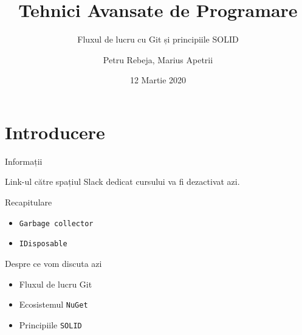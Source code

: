\documentclass[presentation]{beamer}
\author{Petru Rebeja, Marius Apetrii}
\date{12 Martie 2020}
\title{Tehnici Avansate de Programare}
\subtitle{Fluxul de lucru cu Git și principiile SOLID}
\institute[UAIC]{Facultatea de Matematică\\Universitatea Alexandru Ioan Cuza, Iași}
\begin{document}
\maketitle
\section{Introducere}
\label{sec:org28c45fa}
\begin{frame}[label={sec:orgdb6be40}]{Informații}
\begin{center}
Link-ul către spațiul Slack dedicat cursului va fi dezactivat azi.
\end{center}
\end{frame}
\begin{frame}[label={sec:org5fca9d6},fragile]{Recapitulare}
 \begin{itemize}
\item \texttt{Garbage collector}
\item \texttt{IDisposable}
\end{itemize}
\end{frame}
\begin{frame}[label={sec:org298c2e3},fragile]{Despre ce vom discuta azi}
 \begin{itemize}
\item Fluxul de lucru Git
\item Ecosistemul \texttt{NuGet}
\item Principiile \texttt{SOLID}
\end{itemize}
\end{frame}
\end{document}
